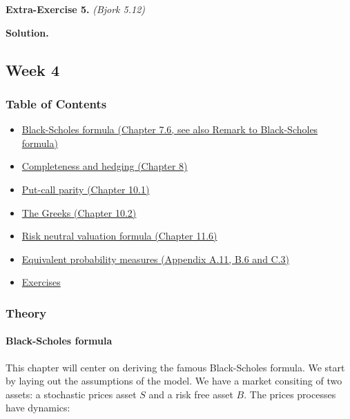 \documentclass[
]{article}
\begin{document}
\textbf{Extra-Exercise 5.} \emph{(Bjork 5.12)}

\textbf{Solution.}

\hypertarget{week-4}{%
\subsection{Week 4}\label{week-4}}

\hypertarget{table-of-contents-3}{%
\subsubsection{Table of Contents}\label{table-of-contents-3}}

\begin{itemize}
\item
  \protect\hyperlink{black-scholes-formula}{Black-Scholes formula
  (Chapter 7.6, see also Remark to Black-Scholes formula)}
\item
  \protect\hyperlink{completeness-and-hedging}{Completeness and hedging
  (Chapter 8)}
\item
  \protect\hyperlink{put-call-parity}{Put-call parity (Chapter 10.1)}
\item
  \protect\hyperlink{the-greeks}{The Greeks (Chapter 10.2)}
\item
  \protect\hyperlink{risk-neutral-valuation-formula}{Risk neutral
  valuation formula (Chapter 11.6)}
\item
  \protect\hyperlink{equivalent-probability-measures}{Equivalent
  probability measures (Appendix A.11, B.6 and C.3)}
\item
  \protect\hyperlink{exercises-week-4}{Exercises}
\end{itemize}

\hypertarget{theory-3}{%
\subsubsection{Theory}\label{theory-3}}

\hypertarget{black-scholes-formula}{%
\paragraph{Black-Scholes formula}\label{black-scholes-formula}}

This chapter will center on deriving the famous Black-Scholes formula.
We start by laying out the assumptions of the model. We have a market
consiting of two assets: a stochastic prices asset \(S\) and a risk free
asset \(B\). The prices processes have dynamics:
\end{document}
